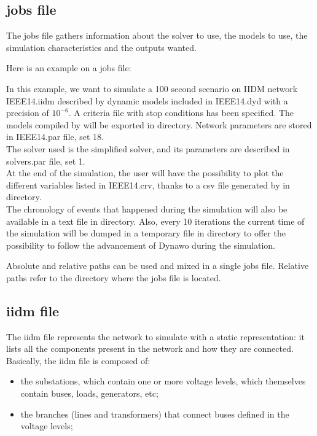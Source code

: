 \documentclass[a4paper, 12pt]{report}
\begin{document}
\subsection{jobs file}

The jobs file gathers information about the solver to use, the models to use, the simulation characteristics and the outputs wanted.

Here is an example on a jobs file:


In this example, we want to simulate a 100 second scenario on IIDM network
IEEE14.iidm described by dynamic models included in IEEE14.dyd with a precision
of $10^{-6}$. A criteria file with stop conditions has been specified.
The models compiled by \Dynawo will be exported in  directory. Network parameters are stored in IEEE14.par file, set 18. \\

The solver used is the simplified solver, and its parameters are described in solvers.par file, set 1. \\

At the end of the simulation, the user will have the possibility to plot the different variables listed in IEEE14.crv, thanks to a csv file generated by \Dynawo in  directory. \\

The chronology of events that happened during the simulation will also be
available in a text file in  directory. Also, every 10
iterations the current time of the simulation will be dumped in a
temporary file in  directory to offer the possibility to follow the advancement of Dynawo during the simulation.

Absolute and relative paths can be used and mixed in a single jobs file. Relative paths refer to the directory where the jobs file is located.

\subsection{iidm file}

The iidm file represents the network to simulate with a static representation: it lists all the components present in the network and how they are connected. \\

Basically, the iidm file is composed of:
\begin{itemize}
\item the substations, which contain one or more voltage levels, which themselves contain buses, loads, generators, etc;
\item the branches (lines and transformers) that connect buses defined in the voltage levels;
\end{itemize}
\end{document}
